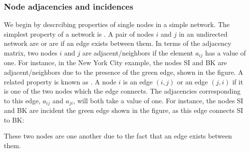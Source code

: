 \documentclass[letterpaper,10pt,english]{jupyterBook}
\begin{document}
\subsubsection{Node adjacencies and incidences}
\label{\detokenize{representations/ch4/properties-of-networks:node-adjacencies-and-incidences}}
\sphinxAtStartPar
We begin by descrcibing properties of single nodes in a simple network. The simplest property of a network is . A pair of nodes \(i\) and \(j\) in an undirected network are  or are  if an edge exists between them. In terms of the adjacency matrix, two nodes \(i\) and \(j\) are adjacent/neighbors if the element \(a_{ij}\) has a value of one. For instance, in the New York City example, the nodes SI and BK are adjacent/neighbors due to the presence of the green edge, shown in the figure. A related property is known as . A node \(i\) is  an edge \((i, j)\) or an edge \((j,i)\) if it is one of the two nodes which the edge connects. The adjacencies corresponding to this edge, \(a_{ij}\) and \(a_{ji}\), will both take a value of one. For instance, the nodes SI and BK are incident the green edge shown in the figure, as this edge connects SI to BK:

\noindent{}

\sphinxAtStartPar
These two nodes are  one another due to the fact that an edge exists between them.
\end{document}
